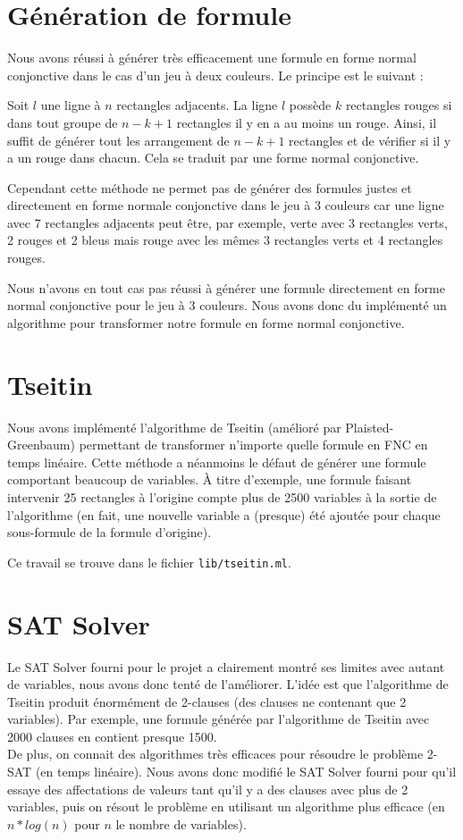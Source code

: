 \documentclass[10pt,a4paper]{article}
\begin{document}
\section{Génération de formule}

Nous avons réussi à générer très efficacement une formule en forme normal conjonctive dans le cas d'un jeu à deux couleurs. Le principe est le suivant :

Soit $l$ une ligne à $n$ rectangles adjacents. La ligne $l$ possède $k$ rectangles rouges si dans tout groupe de $n-k+1$ rectangles il y en a au moins un rouge. Ainsi, il suffit de générer tout les arrangement de $n-k+1$ rectangles et de vérifier si il y a un rouge dans chacun. Cela se traduit par une forme normal conjonctive.

Cependant cette méthode ne permet pas de générer des formules justes et directement en forme normale conjonctive dans le jeu à 3 couleurs car une ligne avec 7 rectangles adjacents peut être, par exemple, verte avec 3 rectangles verts, 2 rouges et 2 bleus mais rouge avec les mêmes 3 rectangles verts et 4 rectangles rouges.

Nous n'avons en tout cas pas réussi à générer une formule directement en forme normal conjonctive pour le jeu à 3 couleurs. Nous avons donc du implémenté un algorithme pour transformer notre formule en forme normal conjonctive.


\section{Tseitin}
Nous avons implémenté l'algorithme de Tseitin (amélioré par Plaisted-Greenbaum) permettant de transformer n'importe quelle formule en FNC en temps linéaire.
Cette méthode a néanmoins le défaut de générer une formule comportant beaucoup de variables. À titre d'exemple, une formule faisant intervenir 25 rectangles à l'origine compte plus de 2500 variables à la sortie de l'algorithme (en fait, une nouvelle variable a (presque) été ajoutée pour chaque sous-formule de la formule d'origine).

Ce travail se trouve dans le fichier \verb|lib/tseitin.ml|.

\section{SAT Solver}
Le SAT Solver fourni pour le projet a clairement montré ses limites avec autant de variables, nous avons donc tenté de l'améliorer. L'idée est que l'algorithme de Tseitin produit énormément de 2-clauses (des clauses ne contenant que 2 variables). Par exemple, une formule générée par l'algorithme de Tseitin avec 2000 clauses en contient presque 1500.\\
De plus, on connait des algorithmes très efficaces pour résoudre le problème 2-SAT (en temps linéaire). Nous avons donc modifié le SAT Solver fourni pour qu'il essaye des affectations de valeurs tant qu'il y a des clauses avec plus de 2 variables, puis on résout le problème en utilisant un algorithme plus efficace (en $n*log(n)$ pour $n$ le nombre de variables).
\end{document}
